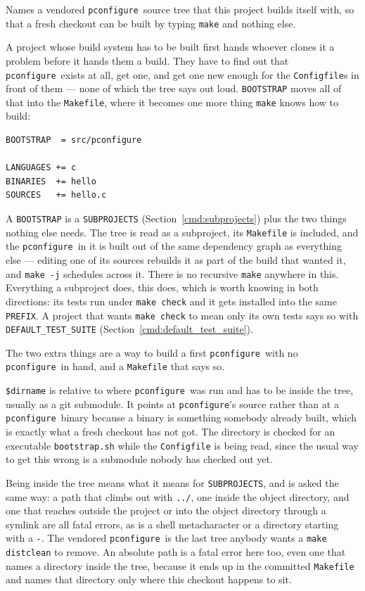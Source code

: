 \documentclass{article}
\newcommand{\pconfigure}{\texttt{pconfigure}}
\begin{document}
Names a vendored \pconfigure\ source tree that this project builds
itself with, so that a fresh checkout can be built by typing
\texttt{make} and nothing else.

A project whose build system has to be built first hands whoever
clones it a problem before it hands them a build.  They have to find
out that \pconfigure\ exists at all, get one, and get one new enough
for the \texttt{Configfile}s in front of them --- none of which the
tree says out loud.  \texttt{BOOTSTRAP} moves all of that into the
\texttt{Makefile}, where it becomes one more thing \texttt{make} knows
how to build:

\begin{verbatim}
BOOTSTRAP  = src/pconfigure

LANGUAGES += c
BINARIES  += hello
SOURCES   += hello.c
\end{verbatim}

A \texttt{BOOTSTRAP} is a \texttt{SUBPROJECTS}
(Section~\ref{cmd:subprojects}) plus the two things nothing else
needs.  The tree is read as a subproject, its \texttt{Makefile} is
included, and the \pconfigure\ in it is built out of the same
dependency graph as everything else --- editing one of its sources
rebuilds it as part of the build that wanted it, and \texttt{make -j}
schedules across it.  There is no recursive \texttt{make} anywhere in
this.  Everything a subproject does, this does, which is worth knowing
in both directions: its tests run under \texttt{make check} and it
gets installed into the same \texttt{PREFIX}.  A project that wants
\texttt{make check} to mean only its own tests says so with
\texttt{DEFAULT\_TEST\_SUITE} (Section~\ref{cmd:default_test_suite}).

The two extra things are a way to build a first \pconfigure\ with no
\pconfigure\ in hand, and a \texttt{Makefile} that says so.

\texttt{\$dirname} is relative to where \pconfigure\ was run and has
to be inside the tree, usually as a git submodule.  It points at
\pconfigure's source rather than at a \pconfigure\ binary because a
binary is something somebody already built, which is exactly what a
fresh checkout has not got.  The directory is checked for an
executable \texttt{bootstrap.sh} while the \texttt{Configfile} is
being read, since the usual way to get this wrong is a submodule
nobody has checked out yet.

Being inside the tree means what it means for \texttt{SUBPROJECTS},
and is asked the same way: a path that climbs out with \texttt{../},
one inside the object directory, and one that reaches outside the
project or into the object directory through a symlink are all fatal
errors, as is a shell metacharacter or a directory starting with a
\texttt{-}.  The vendored \pconfigure\ is the
last tree anybody wants a \texttt{make distclean} to remove.  An
absolute path is a fatal error here too, even one that names a
directory inside the tree, because it ends up in the committed
\texttt{Makefile} and names that directory only where this checkout
happens to sit.
\end{document}
